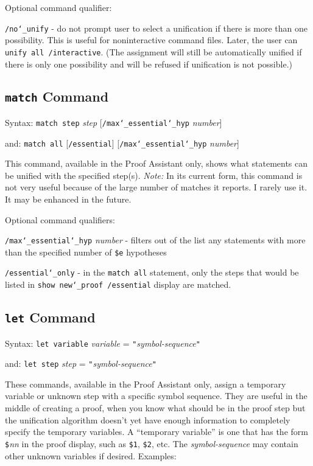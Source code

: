 Optional command qualifier:

    \texttt{/no{\char`\_}unify} - do not prompt user to select a unification if there is
        more than one possibility.  This is useful for noninteractive
        command files.  Later, the user can \texttt{unify all /interactive}.
        (The assignment will still be automatically unified if there is only
        one possibility and will be refused if unification is not possible.)



\subsection{\texttt{match} Command}
Syntax:  \texttt{match step} {\em step} [\texttt{/max{\char`\_}essential{\char`\_}hyp}
{\em number}]

    and:  \texttt{match all} [\texttt{/essential}]
          [\texttt{/max{\char`\_}essential{\char`\_}hyp} {\em number}]

This command, available in the Proof Assistant only, shows what
statements can be unified with the specified step(s).  {\em Note:} In
its current form, this command is not very useful because of the large
number of matches it reports.  I rarely use it.
It may be enhanced in the future.

Optional command qualifiers:

    \texttt{/max{\char`\_}essential{\char`\_}hyp} {\em number} - filters out
        of the list any statements
        with more than the specified number of
        \texttt{\$e} hypotheses

    \texttt{/essential{\char`\_}only} - in the \texttt{match all} statement, only
        the steps that
        would be listed in \texttt{show new{\char`\_}proof /essential} display are
        matched.



\subsection{\texttt{let} Command}
Syntax: \texttt{let variable} {\em variable} = \verb/"/{\em symbol-sequence}\verb/"/

  and: \texttt{let step} {\em step} = \verb/"/{\em symbol-sequence}\verb/"/

These commands, available in the Proof Assistant
only, assign a temporary variable or unknown
step with a specific symbol sequence.  They are useful in the middle of
creating a proof, when you know what should be in the proof step but the
unification algorithm doesn't yet have enough information to completely
specify the temporary variables.  A ``temporary variable'' is one that
has the form \texttt{\$}{\em nn} in the proof display, such as
\texttt{\$1}, \texttt{\$2}, etc.  The {\em symbol-sequence} may contain
other unknown variables if desired.  Examples:

